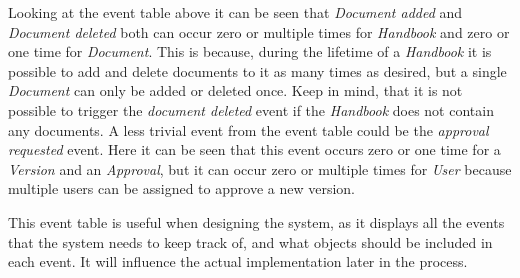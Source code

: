 Looking at the event table above it can be seen that \textit{Document added} and \textit{Document deleted} both can occur zero or multiple times for \textit{Handbook} and zero or one time for \textit{Document}.
This is because, during the lifetime of a \textit{Handbook} it is possible to add and delete documents to it as many times as desired, but a single \textit{Document} can only be added or deleted once.
Keep in mind, that it is not possible to trigger the \textit{document deleted} event if the \textit{Handbook} does not contain any documents.
A less trivial event from the event table could be the \textit{approval requested} event.
Here it can be seen that this event occurs zero or one time for a \textit{Version} and an \textit{Approval}, but it can occur zero or multiple times for \textit{User} because multiple users can be assigned to approve a new version.

This event table is useful when designing the system, as it displays all the events that the system needs to keep track of, and what objects should be included in each event.
It will influence the actual implementation later in the process.

